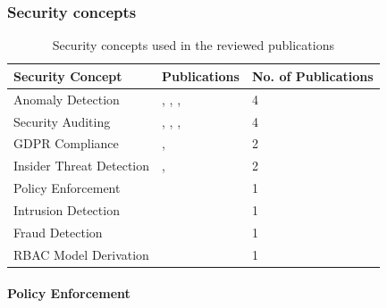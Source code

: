 \documentclass[runningheads]{llncs}
\begin{document}
\subsubsection{Security concepts}\label{concepts}
\begin{table}
    \centering
    \caption{Security concepts used in the reviewed publications}
    \label{concepts_table}
    \begin{tabular}{ | l | l | l | }
        \hline
        \textbf{Security Concept} & \textbf{Publications}                                                                           & \textbf{No. of Publications} \\
        \hline
        \hline
        Anomaly Detection         & \cite{Fazzinga2020}, \cite{MozafariMehr2022397}, \cite{Breitmayer202411}, \cite{Sarno2020}      & 4                            \\
        \hline
        Security Auditing         & \cite{Accorsi20131462}, \cite{Zahoransky2014360}, \cite{Yunizal20221387}, \cite{Dedousis202235} & 4                            \\
        \hline
        GDPR Compliance           & \cite{Zaman20192982}, \cite{MozafariMehr202182}                                                 & 2                            \\
        \hline
        Insider Threat Detection  & \cite{Zhu201783}, \cite{MacAk2020}                                                              & 2                            \\
        \hline
        Policy Enforcement        & \cite{Talamo2013}                                                                               & 1                            \\
        \hline
        Intrusion Detection       & \cite{Mishra2018613}                                                                            & 1                            \\
        \hline
        Fraud Detection           & \cite{Mardani2013}                                                                              & 1                            \\
        \hline
        RBAC Model Derivation     & \cite{Leitner2013719}                                                                           & 1                            \\
        \hline
    \end{tabular}
\end{table}
\paragraph{Policy Enforcement}
\end{document}
